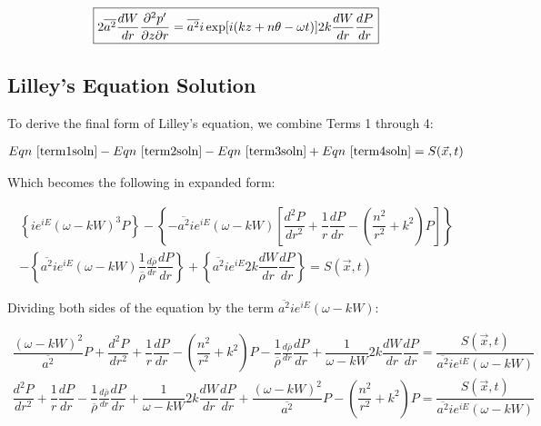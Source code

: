 \documentclass[]{aiaa-tc}%
\begin{document}
\begin{equation} \label{term4soln}
\boxed{2\overline{a^2} \dfrac{dW}{dr}\dfrac{\partial^2p'}{\partial z\partial r}
  = \overline{a^2} i\exp[i(kz + n\theta -\omega t)]
    2k \dfrac{dW}{dr} \dfrac{dP}{dr} } \\
\end{equation}




\subsection{Lilley's Equation Solution}

To derive the final form of Lilley's equation, we combine Terms 1 through 4:

\begin{align*}
Eqn~\ref{term1soln} - Eqn~\ref{term2soln} - Eqn~\ref{term3soln} + Eqn~\ref{term4soln} = S(\vec{x}, t)
\end{align*}

Which becomes the following in expanded form:

\begin{align*}
\left\{ ie^{iE} (\omega - kW)^3 P \right\}
- \left\{ - \overline{a^2} ie^{iE}
    (\omega - kW) \left[ \dfrac{d^2P}{dr^2}
    + \dfrac{1}{r} \dfrac{dP}{dr}
    - \left( \dfrac{n^2}{r^2} + k^2 \right) P \right] \right\} \\
- \left\{ \overline{a^2} ie^{iE} (\omega - kW)
    \dfrac{1}{\overline{\rho}}\frac{d \overline{\rho}}{dr} \dfrac{dP}{dr} \right\}
+ \left\{ \overline{a^2} ie^{iE} 2k \dfrac{dW}{dr} \dfrac{dP}{dr} \right\}
= S(\vec{x}, t)
\end{align*}

Dividing both sides of the equation by the term $\overline{a^2} ie^{iE} (\omega - kW)$:

\begin{align*}
\dfrac{(\omega - kW)^2}{\overline{a^2}} P
+ \dfrac{d^2P}{dr^2}
+ \dfrac{1}{r} \dfrac{dP}{dr}
- \left( \dfrac{n^2}{r^2} + k^2 \right) P
- \dfrac{1}{\overline{\rho}}\frac{d \overline{\rho}}{dr} \dfrac{dP}{dr}
+ \dfrac{1}{\omega - kW} 2k \dfrac{dW}{dr} \dfrac{dP}{dr}
= \dfrac{S(\vec{x}, t)}{\overline{a^2} ie^{iE} (\omega - kW)} \\
\dfrac{d^2P}{dr^2}
+ \dfrac{1}{r} \dfrac{dP}{dr}
- \dfrac{1}{\overline{\rho}}\frac{d \overline{\rho}}{dr} \dfrac{dP}{dr}
+ \dfrac{1}{\omega - kW} 2k \dfrac{dW}{dr} \dfrac{dP}{dr}
+ \dfrac{(\omega - kW)^2}{\overline{a^2}} P
- \left( \dfrac{n^2}{r^2} + k^2 \right) P
= \dfrac{S(\vec{x}, t)}{\overline{a^2} ie^{iE} (\omega - kW)} \\
\end{align*}
\end{document}
